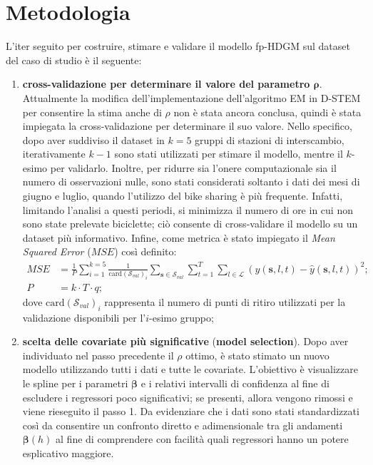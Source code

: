 \section{Metodologia}
\label{metodologia}
L'iter seguito per costruire, stimare e validare il modello fp-HDGM sul dataset del caso di studio è il seguente:
\begin{enumerate}
	\item \textbf{cross-validazione per determinare il valore del parametro $\boldsymbol{\rho}$}. Attualmente la modifica dell'implementazione dell'algoritmo EM in D-STEM per consentire la stima anche di $\rho$ non è stata ancora conclusa, quindi è stata impiegata la cross-validazione per determinare il suo valore. Nello specifico, dopo aver suddiviso il dataset in $k=5$ gruppi di stazioni di interscambio, iterativamente $k-1$ sono stati utilizzati per stimare il modello, mentre il $k$-esimo per validarlo. Inoltre, per ridurre sia l'onere computazionale sia il numero di osservazioni nulle, sono stati considerati soltanto i dati dei mesi di giugno e luglio, quando l'utilizzo del bike sharing è più frequente. Infatti, limitando l'analisi a questi periodi, si minimizza il numero di ore in cui non sono state prelevate biciclette; ciò consente di cross-validare il modello su un dataset più informativo. Infine, come metrica è stato impiegato il \textit{Mean Squared Error} ($MSE$) così definito:
	\begin{equation}
		\begin{aligned}
			MSE &= \frac{1}{P}\sum_{i=1}^{k=5}\frac{1}{\text{card}(\mathcal{S}_{val})_i}\sum_{\mathbf{s}\in\mathcal{S}_{val}}^{}\sum_{t=1}^{T}\sum_{l\in\mathcal{L}}^{} (y(\mathbf{s}, l, t) - \hat{y}(\mathbf{s}, l, t))^2; \\
			P &= k\cdot T\cdot q;
		\end{aligned}
	\end{equation}
	dove $\text{card}(\mathcal{S}_{val})_i$ rappresenta il numero di punti di ritiro utilizzati per la validazione disponibili per l'$i$-esimo gruppo;
	\item \textbf{scelta delle covariate più significative} (\textbf{model selection}). Dopo aver individuato nel passo precedente il $\rho$ ottimo, è stato stimato un nuovo modello utilizzando tutti i dati e tutte le covariate. L'obiettivo è visualizzare le spline per i parametri $\boldsymbol{\beta}$ e i relativi intervalli di confidenza al fine di escludere i regressori poco significativi; se presenti, allora vengono rimossi e viene rieseguito il passo \num{1}. Da evidenziare che i dati sono stati standardizzati così da consentire un confronto diretto e adimensionale tra gli andamenti $\boldsymbol{\beta}(h)$ al fine di comprendere con facilità quali regressori hanno un potere esplicativo maggiore.

\end{enumerate}
